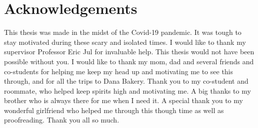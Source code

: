 \chapter*{Acknowledgements}
This thesis was made in the midst of the Covid-19 pandemic. It was tough to stay motivated during these scary and isolated times. I would like to thank my supervisor Professor Eric Jul for invaluable help. This thesis would not have been possible without you. I would like to thank my mom, dad and several friends and co-students for helping me keep my head up and motivating me to see this through, and for all the trips to Dana Bakery. Thank you to my co-student and roommate, who helped keep spirits high and motivating me. A big thanks to my brother who is always there for me when I need it. A special thank you to my wonderful girlfriend who helped me through this though time as well as proofreading. Thank you all so much. 
